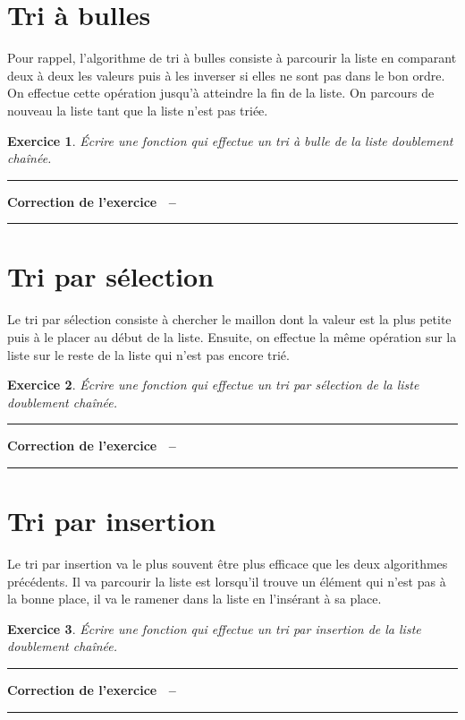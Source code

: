 \documentclass[a4paper]{article}
\newtheorem{Exo}{Exercice}
\newenvironment{Correction}{\par\tiny\blue\rule[1ex]{\textwidth}{1pt}\par\normalsize\textbf{Correction de l'exercice~\theExo{} -- }}{\par\tiny\blue\rule[1ex]{\textwidth}{1pt}\par}
\begin{document}
	\section{Tri à bulles}
		Pour rappel, l'algorithme de tri à bulles consiste à parcourir la liste en comparant deux à deux les valeurs puis à les inverser si elles ne sont pas dans le bon ordre.
		On effectue cette opération jusqu'à atteindre la fin de la liste.
		On parcours de nouveau la liste tant que la liste n'est pas triée.
		\begin{Exo}
			Écrire une fonction qui effectue un tri à bulle de la liste doublement chaînée.
		\end{Exo}
		\begin{Correction}
		\end{Correction}
	\section{Tri par sélection}
		Le tri par sélection consiste à chercher le maillon dont la valeur est la plus petite puis à le placer au début de la liste.
		Ensuite, on effectue la même opération sur la liste sur le reste de la liste qui n'est pas encore trié.
		\begin{Exo}
			Écrire une fonction qui effectue un tri par sélection de la liste doublement chaînée.
		\end{Exo}
		\begin{Correction}
		\end{Correction}
	\section{Tri par insertion}
		Le tri par insertion va le plus souvent être plus efficace que les deux algorithmes précédents.
		Il va parcourir la liste est lorsqu'il trouve un élément qui n'est pas à la bonne place, il va le ramener dans la liste en l'insérant à sa place.
		\begin{Exo}
			Écrire une fonction qui effectue un tri par insertion de la liste doublement chaînée.
		\end{Exo}
		\begin{Correction}
		\end{Correction}
\end{document}
